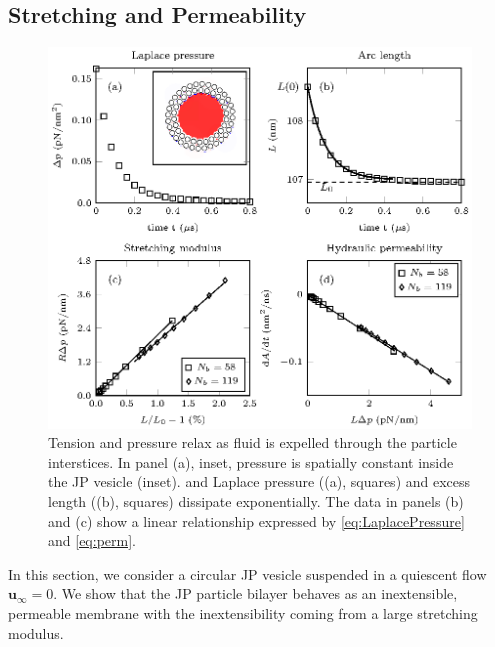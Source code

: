\documentclass[lineno]{jfm}
\newcommand{\uu}{\mathbf{u}}
\begin{document}
\subsection{Stretching and Permeability}
\label{sec:ves_in_quiescent}

\begin{figure}
\centering
\includegraphics[width=\textwidth]{fig7.eps}
\caption{\label{figure2part1} Tension and pressure relax as
  fluid is expelled through the particle interstices. In panel (a), inset, 
  pressure is spatially constant inside the JP vesicle (inset). and 
  Laplace pressure ((a), squares) and excess length ((b), squares) dissipate exponentially.  
  The data in panels (b) and (c) show a linear relationship expressed by
  \eqref{eq:LaplacePressure} and \eqref{eq:perm}. }
\end{figure}
In this section, we consider a circular JP vesicle suspended in a quiescent flow $\uu_{\infty} = 0$.
We show that the JP particle bilayer behaves as an inextensible, permeable membrane with
the inextensibility coming from a large stretching modulus.
\end{document}
